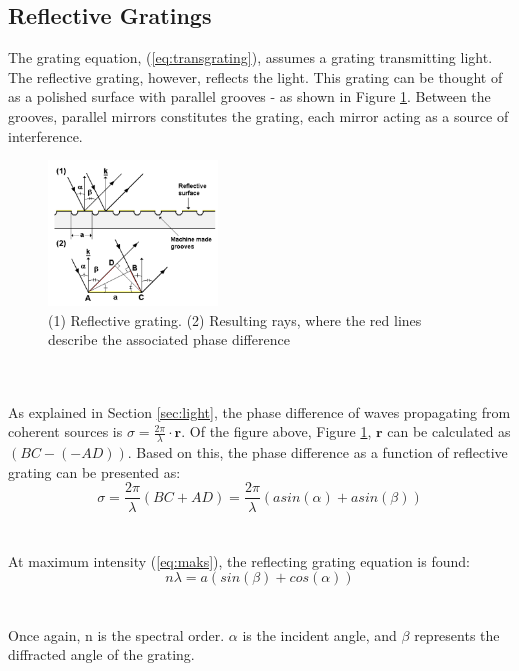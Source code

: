 \subsection{Reflective Gratings}
The grating equation, (\ref{eq:transgrating}), assumes a grating transmitting light. The reflective grating, however, reflects the light. This grating can be thought of as a polished surface with parallel grooves - as shown in Figure \ref{fig:refgrating}. Between the grooves, parallel mirrors constitutes the grating, each mirror acting as a source of interference. 
\begin{figure}[h]
    \centering
    \includegraphics[width=0.4\textwidth]{Images/theory/refgrating.png}
    \caption{(1) Reflective
grating. (2) Resulting rays, where the red lines describe the associated phase difference}
    \label{fig:refgrating}
\end{figure}
\\\\
As explained in Section \ref{sec:light}, the phase difference of waves propagating from coherent sources is $\sigma = \frac{2 \pi}{\lambda} \cdot \textbf{r}$. Of the figure above, Figure \ref{fig:refgrating}, $\textbf{r}$ can be calculated as $(BC - (-AD))$. Based on this, the phase difference as a function of reflective grating can be presented as:
\begin{equation}
    \sigma = \frac{2 \pi}{\lambda}(BC + AD) = \frac{2 \pi}{\lambda} (a sin(\alpha) + a sin(\beta))
\end{equation}
\\\\
At maximum intensity (\ref{eq:maks}), the reflecting grating equation is found:
\begin{equation}
    n \lambda = a (sin(\beta) + cos(\alpha))
    \label{eq:refgrating}
\end{equation}
\\\\
Once again, n is the spectral order. $\alpha$ is the incident angle, and $\beta$ represents the diffracted angle of the grating.

